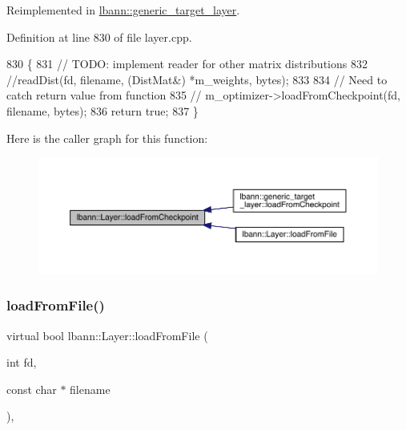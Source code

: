 Reimplemented in \hyperlink{classlbann_1_1generic__target__layer_a2d9f6ac689171acf0caceed3ed4f7ef9}{lbann\+::generic\+\_\+target\+\_\+layer}.



Definition at line 830 of file layer.\+cpp.


\begin{DoxyCode}
830                                                                           \{
831   \textcolor{comment}{// TODO: implement reader for other matrix distributions}
832   \textcolor{comment}{//readDist(fd, filename, (DistMat&) *m\_weights, bytes);}
833 
834   \textcolor{comment}{// Need to catch return value from function}
835   \textcolor{comment}{// m\_optimizer->loadFromCheckpoint(fd, filename, bytes);}
836   \textcolor{keywordflow}{return} \textcolor{keyword}{true};
837 \}
\end{DoxyCode}
Here is the caller graph for this function\+:\nopagebreak
\begin{figure}[H]
\begin{center}
\leavevmode
\includegraphics[width=350pt]{classlbann_1_1Layer_a7ac9335d75d817fc2d5cf171da9b7e22_icgraph}
\end{center}
\end{figure}
\mbox{\label{classlbann_1_1Layer_a1ae0e6015dd427c63236a07f8cbd3878}} 
\subsubsection{\texorpdfstring{load\+From\+File()}{loadFromFile()}}
{\footnotesize\ttfamily virtual bool lbann\+::\+Layer\+::load\+From\+File (\begin{DoxyParamCaption}\item[{int}]{fd,  }\item[{const char $\ast$}]{filename }\end{DoxyParamCaption})\hspace{0.3cm}{\ttfamily [inline]}, {\ttfamily [virtual]}}



